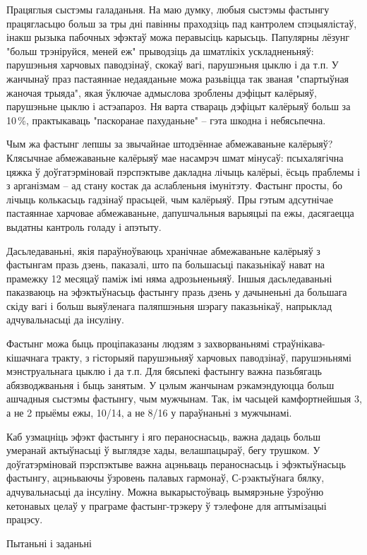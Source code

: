 Працяглыя сыстэмы галаданьня. На маю думку, любыя сыстэмы фастынгу працягласьцю больш за тры дні павінны праходзіць пад кантролем спэцыялістаў, інакш рызыка пабочных эфэктаў можа перавысіць карысьць. Папулярны лёзунг "больш трэніруйся, меней еж" прыводзіць да шматлікіх ускладненьняў: парушэньня харчовых паводзінаў, скокаў вагі, парушэньня цыклю і да т.п. У жанчынаў праз пастаяннае недаяданьне можа разьвіцца так званая "спартыўная жаночая трыяда", якая ўключае адмыслова зроблены дэфіцыт калёрыяў, парушэньне цыклю і астэапароз. Ня варта ствараць дэфіцыт калёрыяў больш за 10\,\%, практыкаваць "паскоранае пахуданьне" – гэта шкодна і небясьпечна.

Чым жа фастынг лепшы за звычайнае штодзённае абмежаваньне калёрыяў? Клясычнае абмежаваньне калёрыяў мае насамрэч шмат мінусаў: псыхалягічна цяжка ў доўгатэрміновай пэрспэктыве дакладна лічыць калёрыі, ёсьць праблемы і з арганізмам – ад стану костак да аслабленьня імунітэту. Фастынг просты, бо лічыць колькасьць гадзінаў прасьцей, чым калёрыяў. Пры гэтым адсутнічае пастаяннае харчовае абмежаваньне, дапушчальныя варыяцыі па ежы, дасягаецца выдатны кантроль голаду і апэтыту.

Дасьледаваньні, якія параўноўваюць хранічнае абмежаваньне калёрыяў з фастынгам празь дзень, паказалі, што па большасьці паказьнікаў нават на прамежку 12 месяцаў паміж імі няма адрозьненьняў. Іншыя дасьледаваньні паказваюць на эфэктыўнасьць фастынгу празь дзень у дачыненьні да большага скіду вагі і больш выяўленага паляпшэньня шэрагу паказьнікаў, напрыклад адчувальнасьці да інсуліну.

Фастынг можа быць проціпаказаны людзям з захворваньнямі страўнікава-кішачнага тракту, з гісторыяй парушэньняў харчовых паводзінаў, парушэньнямі мэнструальнага цыклю і да т.п. Для бясьпекі фастынгу важна пазьбягаць абязводжваньня і быць занятым. У цэлым жанчынам рэкамэндуюцца больш ашчадныя сыстэмы фастынгу, чым мужчынам. Так, ім часьцей камфортнейшыя 3, а не 2 прыёмы ежы, 10/14, а не 8/16 у параўнаньні з мужчынамі.

Каб узмацніць эфэкт фастынгу і яго пераноснасьць, важна дадаць больш умеранай актыўнасьці ў выглядзе хады, велашпацыраў, бегу трушком. У доўгатэрміновай пэрспэктыве важна ацэньваць пераноснасьць і эфэктыўнасьць фастынгу, ацэньваючы ўзровень палавых гармонаў, С-рэактыўнага бялку, адчувальнасьці да інсуліну. Можна выкарыстоўваць вымярэньне ўзроўню кетонавых целаў у праграме фастынг-трэкеру ў тэлефоне для аптымізацыі працэсу.

Пытаньні і заданьні

